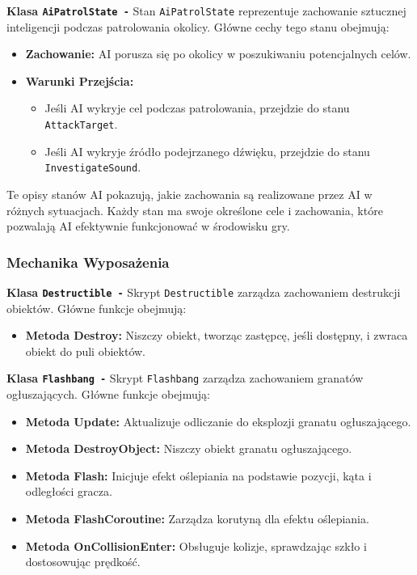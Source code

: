 \textbf{Klasa \texttt{AiPatrolState -}}
Stan \texttt{AiPatrolState} reprezentuje zachowanie sztucznej inteligencji podczas patrolowania okolicy. Główne cechy tego stanu obejmują:
\begin{itemize}
  \item \textbf{Zachowanie:} AI porusza się po okolicy w poszukiwaniu potencjalnych celów.
  \item \textbf{Warunki Przejścia:}
    \begin{itemize}
      \item Jeśli AI wykryje cel podczas patrolowania, przejdzie do stanu \texttt{AttackTarget}.
      \item Jeśli AI wykryje źródło podejrzanego dźwięku, przejdzie do stanu \texttt{InvestigateSound}.
    \end{itemize}
\end{itemize}

Te opisy stanów AI pokazują, jakie zachowania są realizowane przez AI w różnych sytuacjach. Każdy stan ma swoje określone cele i zachowania, które pozwalają AI efektywnie funkcjonować w środowisku gry.

\subsubsection{Mechanika Wyposażenia}

\textbf{Klasa \texttt{Destructible -}}
Skrypt \texttt{Destructible} zarządza zachowaniem destrukcji obiektów. Główne funkcje obejmują:
\begin{itemize}
  \item \textbf{Metoda Destroy:} Niszczy obiekt, tworząc zastępcę, jeśli dostępny, i zwraca obiekt do puli obiektów.
\end{itemize}

\textbf{Klasa \texttt{Flashbang -}}
Skrypt \texttt{Flashbang} zarządza zachowaniem granatów ogłuszających. Główne funkcje obejmują:
\begin{itemize}
  \item \textbf{Metoda Update:} Aktualizuje odliczanie do eksplozji granatu ogłuszającego.
  \item \textbf{Metoda DestroyObject:} Niszczy obiekt granatu ogłuszającego.
  \item \textbf{Metoda Flash:} Inicjuje efekt oślepiania na podstawie pozycji, kąta i odległości gracza.
  \item \textbf{Metoda FlashCoroutine:} Zarządza korutyną dla efektu oślepiania.
  \item \textbf{Metoda OnCollisionEnter:} Obsługuje kolizje, sprawdzając szkło i dostosowując prędkość.
\end{itemize}

